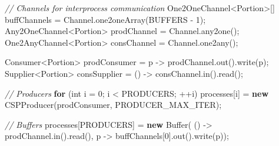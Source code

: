 \documentclass[11pt]{article}
\newenvironment{Shaded}{}{}
\newcommand{\KeywordTok}[1]{\textcolor[rgb]{0.00,0.44,0.13}{\textbf{{#1}}}}
\newcommand{\DataTypeTok}[1]{\textcolor[rgb]{0.56,0.13,0.00}{{#1}}}
\newcommand{\DecValTok}[1]{\textcolor[rgb]{0.25,0.63,0.44}{{#1}}}
\newcommand{\CommentTok}[1]{\textcolor[rgb]{0.38,0.63,0.69}{\textit{{#1}}}}
\newcommand{\FunctionTok}[1]{\textcolor[rgb]{0.02,0.16,0.49}{{#1}}}
\newcommand{\NormalTok}[1]{{#1}}
\newcommand{\ControlFlowTok}[1]{\textcolor[rgb]{0.00,0.44,0.13}{\textbf{{#1}}}}
\newcommand{\OperatorTok}[1]{\textcolor[rgb]{0.40,0.40,0.40}{{#1}}}
\newcommand{\BuiltInTok}[1]{{#1}}
\begin{document}
\begin{Shaded}
\begin{Highlighting}[]
        \CommentTok{// Channels for interprocess communication}
\NormalTok{        One2OneChannel}\OperatorTok{\textless{}}\NormalTok{Portion}\OperatorTok{\textgreater{}[]}\NormalTok{ buffChannels }\OperatorTok{=} \BuiltInTok{Channel}\OperatorTok{.}\FunctionTok{one2oneArray}\OperatorTok{(}\NormalTok{BUFFERS }\OperatorTok{{-}} \DecValTok{1}\OperatorTok{);}
\NormalTok{        Any2OneChannel}\OperatorTok{\textless{}}\NormalTok{Portion}\OperatorTok{\textgreater{}}\NormalTok{ prodChannel }\OperatorTok{=} \BuiltInTok{Channel}\OperatorTok{.}\FunctionTok{any2one}\OperatorTok{();}
\NormalTok{        One2AnyChannel}\OperatorTok{\textless{}}\NormalTok{Portion}\OperatorTok{\textgreater{}}\NormalTok{ consChannel }\OperatorTok{=} \BuiltInTok{Channel}\OperatorTok{.}\FunctionTok{one2any}\OperatorTok{();}

\NormalTok{        Consumer}\OperatorTok{\textless{}}\NormalTok{Portion}\OperatorTok{\textgreater{}}\NormalTok{ prodConsumer }\OperatorTok{=}\NormalTok{ p }\OperatorTok{{-}\textgreater{}}\NormalTok{ prodChannel}\OperatorTok{.}\FunctionTok{out}\OperatorTok{().}\FunctionTok{write}\OperatorTok{(}\NormalTok{p}\OperatorTok{);}
\NormalTok{        Supplier}\OperatorTok{\textless{}}\NormalTok{Portion}\OperatorTok{\textgreater{}}\NormalTok{ consSupplier }\OperatorTok{=} \OperatorTok{()} \OperatorTok{{-}\textgreater{}}\NormalTok{ consChannel}\OperatorTok{.}\FunctionTok{in}\OperatorTok{().}\FunctionTok{read}\OperatorTok{();}

        \CommentTok{// Producers}
        \ControlFlowTok{for} \OperatorTok{(}\DataTypeTok{int}\NormalTok{ i }\OperatorTok{=} \DecValTok{0}\OperatorTok{;}\NormalTok{ i }\OperatorTok{\textless{}}\NormalTok{ PRODUCERS}\OperatorTok{;} \OperatorTok{++}\NormalTok{i}\OperatorTok{)}
\NormalTok{            processes}\OperatorTok{[}\NormalTok{i}\OperatorTok{]} \OperatorTok{=} \KeywordTok{new} \FunctionTok{CSPProducer}\OperatorTok{(}\NormalTok{prodConsumer}\OperatorTok{,}\NormalTok{ PRODUCER\_MAX\_ITER}\OperatorTok{);}

        \CommentTok{// Buffers}
\NormalTok{        processes}\OperatorTok{[}\NormalTok{PRODUCERS}\OperatorTok{]} \OperatorTok{=} \KeywordTok{new} \BuiltInTok{Buffer}\OperatorTok{(}
                \OperatorTok{()} \OperatorTok{{-}\textgreater{}}\NormalTok{ prodChannel}\OperatorTok{.}\FunctionTok{in}\OperatorTok{().}\FunctionTok{read}\OperatorTok{(),}
\NormalTok{                p }\OperatorTok{{-}\textgreater{}}\NormalTok{ buffChannels}\OperatorTok{[}\DecValTok{0}\OperatorTok{].}\FunctionTok{out}\OperatorTok{().}\FunctionTok{write}\OperatorTok{(}\NormalTok{p}\OperatorTok{));}


\end{Highlighting}
\end{Shaded}
\end{document}

